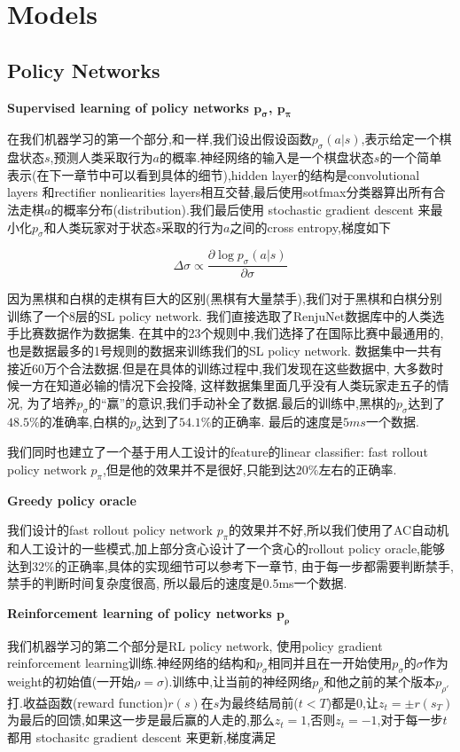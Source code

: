 \documentclass[twocolumn]{article}
\begin{document}
\section{Models}

\subsection{Policy Networks}

\noindent \textbf{Supervised learning of policy networks $\bm{p_\sigma}$, $\bm{p_\pi}$}

在我们机器学习的第一个部分,和\cite{alphago}一样,我们设出假设函数$p_\sigma(a|s)$,表示给定一个棋盘状态$s$,预测人类采取行为$a$的概率.神经网络的输入是一个棋盘状态$s$的一个简单表示(在下一章节中可以看到具体的细节),hidden layer的结构是convolutional layers 和rectifier nonliearities layers相互交替,最后使用sotfmax分类器算出所有合法走棋$a$的概率分布(distribution).我们最后使用 stochastic gradient descent 来最小化$p_\sigma$和人类玩家对于状态$s$采取的行为$a$之间的cross entropy,梯度如下

\[
\Delta\sigma \propto \frac{\partial\log p_\sigma(a|s)}{\partial \sigma}
\]

因为黑棋和白棋的走棋有巨大的区别(黑棋有大量禁手),我们对于黑棋和白棋分别训练了一个$8$层的SL policy network. 我们直接选取了RenjuNet\cite{renjunet}数据库中的人类选手比赛数据作为数据集. 在其中的23个规则中,我们选择了在国际比赛中最通用的,也是数据最多的1号规则的数据来训练我们的SL policy network. 数据集中一共有接近60万个合法数据.但是在具体的训练过程中,我们发现在这些数据中, 大多数时候一方在知道必输的情况下会投降, 这样数据集里面几乎没有人类玩家走五子的情况, 为了培养$p_\sigma$的“赢”的意识,我们手动补全了数据.最后的训练中,黑棋的$p_\sigma$达到了$48.5\%$的准确率,白棋的$p_\sigma$达到了$54.1\%$的正确率. 最后的速度是$5ms$一个数据.

我们同时也建立了一个基于用人工设计的feature的linear classifier: fast rollout policy network $p_\pi$,但是他的效果并不是很好,只能到达$20\%$左右的正确率.

\noindent \textbf{Greedy policy oracle}

我们设计的fast rollout policy network $p_\pi$的效果并不好,所以我们使用了AC自动机和人工设计的一些模式,加上部分贪心设计了一个贪心的rollout policy oracle,能够达到$32\%$的正确率,具体的实现细节可以参考下一章节, 由于每一步都需要判断禁手, 禁手的判断时间复杂度很高, 所以最后的速度是0.5ms一个数据.

\noindent \textbf{Reinforcement learning of policy networks $\bm{p_\rho}$}

我们机器学习的第二个部分是RL policy network, 使用policy gradient reinforcement learning训练.神经网络的结构和$p_\sigma$相同并且在一开始使用$p_\sigma$的$\sigma$作为weight的初始值(一开始$\rho = \sigma$).训练中,让当前的神经网络$p_\rho$和他之前的某个版本$p_{\rho'}$打.收益函数(reward function)$r(s)$在$s$为最终结局前($t < T$)都是0,让$z_t=\pm r(s_T)$为最后的回馈,如果这一步是最后赢的人走的,那么$z_t = 1$,否则$z_t = -1$,对于每一步$t$都用 stochasitc gradient descent 来更新,梯度满足
\end{document}
